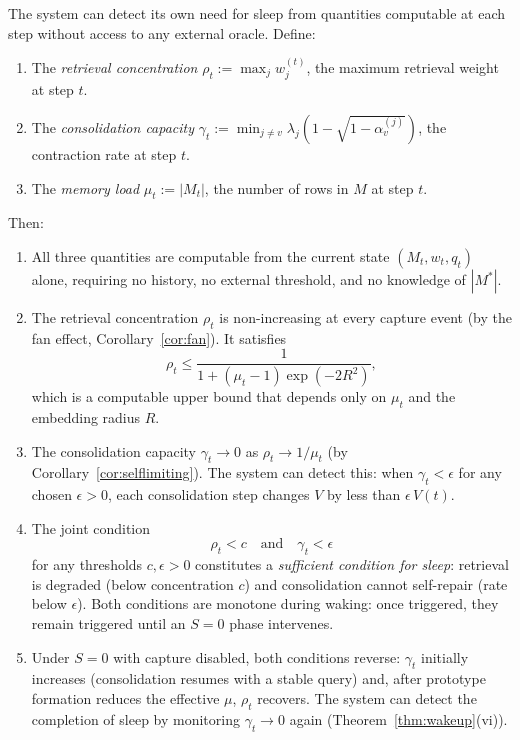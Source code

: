 \begin{theorem}
\label{thm:self_observable}
\leanok
{}
The system can detect its own need for sleep from quantities computable at each step without access to any external oracle.  Define:
\begin{enumerate}
\item The \emph{retrieval concentration} $\rho_t := \max_j w_j^{(t)}$, the maximum retrieval weight at step $t$.
\item The \emph{consolidation capacity} $\gamma_t := \min_{j \neq v}\lambda_j(1 - \sqrt{1 - \alpha_v^{(j)}})$, the contraction rate at step $t$.
\item The \emph{memory load} $\mu_t := |M_t|$, the number of rows in $M$ at step $t$.
\end{enumerate}
Then:
\begin{enumerate}
\item All three quantities are computable from the current state $(M_t, w_t, q_t)$ alone, requiring no history, no external threshold, and no knowledge of $|M^*|$.
\item The retrieval concentration $\rho_t$ is non-increasing at every capture event (by the fan effect, Corollary~\ref{cor:fan}).  It satisfies
\[
\rho_t \leq \frac{1}{1 + (\mu_t - 1)\exp(-2R^2)},
\]
which is a computable upper bound that depends only on $\mu_t$ and the embedding radius $R$.
\item The consolidation capacity $\gamma_t \to 0$ as $\rho_t \to 1/\mu_t$ (by Corollary~\ref{cor:selflimiting}).  The system can detect this: when $\gamma_t < \epsilon$ for any chosen $\epsilon > 0$, each consolidation step changes $V$ by less than $\epsilon\,V(t)$.
\item The joint condition
\[
\rho_t < c \quad \text{and} \quad \gamma_t < \epsilon
\]
for any thresholds $c, \epsilon > 0$ constitutes a \emph{sufficient condition for sleep}: retrieval is degraded (below concentration $c$) and consolidation cannot self-repair (rate below $\epsilon$).  Both conditions are monotone during waking: once triggered, they remain triggered until an $S = 0$ phase intervenes.
\item Under $S = 0$ with capture disabled, both conditions reverse: $\gamma_t$ initially increases (consolidation resumes with a stable query) and, after prototype formation reduces the effective $\mu$, $\rho_t$ recovers.  The system can detect the completion of sleep by monitoring $\gamma_t \to 0$ again (Theorem~\ref{thm:wakeup}(vi)).
\end{enumerate}
\end{theorem}

